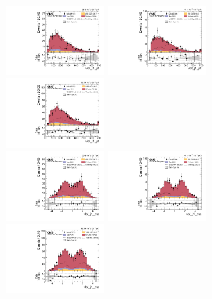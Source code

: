 \begin{figure}[!ht]
  \centering
  \includegraphics[width=0.335\textwidth]{analysis_plots/2016_zv/cr_vjets_l/vbf_j1_pt.pdf} \hspace{-10pt}
  \includegraphics[width=0.335\textwidth]{analysis_plots/2017_zv/cr_vjets_l/vbf_j1_pt.pdf} \hspace{-10pt}
  \includegraphics[width=0.335\textwidth]{analysis_plots/2018_zv/cr_vjets_l/vbf_j1_pt.pdf} \hspace{-10pt} \\
  \includegraphics[width=0.335\textwidth]{analysis_plots/2016_zv/cr_vjets_l/vbf_j1_eta.pdf} \hspace{-10pt}
  \includegraphics[width=0.335\textwidth]{analysis_plots/2017_zv/cr_vjets_l/vbf_j1_eta.pdf} \hspace{-10pt}
  \includegraphics[width=0.335\textwidth]{analysis_plots/2018_zv/cr_vjets_l/vbf_j1_eta.pdf} \hspace{-10pt} \\

\end{figure}
